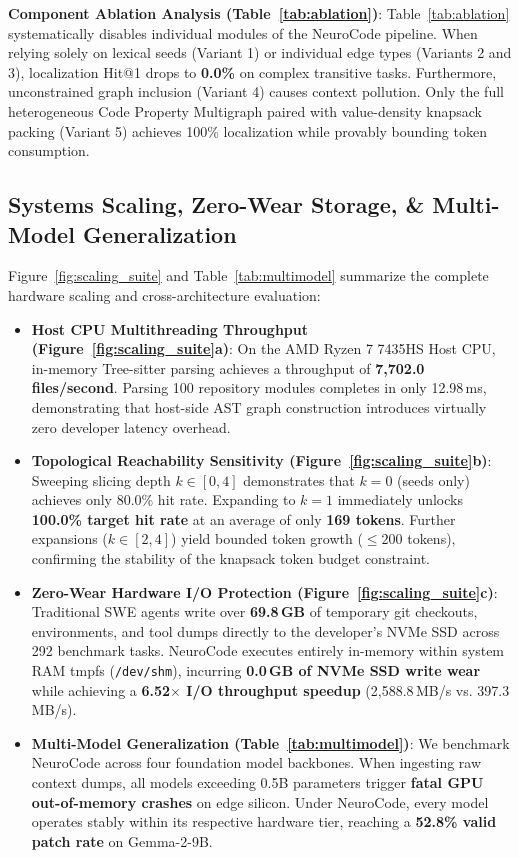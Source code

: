 \textbf{Component Ablation Analysis (Table~\ref{tab:ablation})}: Table~\ref{tab:ablation} systematically disables individual modules of the NeuroCode pipeline. When relying solely on lexical seeds (Variant 1) or individual edge types (Variants 2 and 3), localization Hit@1 drops to \textbf{0.0\%} on complex transitive tasks. Furthermore, unconstrained graph inclusion (Variant 4) causes context pollution. Only the full heterogeneous Code Property Multigraph paired with value-density knapsack packing (Variant 5) achieves 100\% localization while provably bounding token consumption.

\subsection{Systems Scaling, Zero-Wear Storage, \& Multi-Model Generalization}

Figure~\ref{fig:scaling_suite} and Table~\ref{tab:multimodel} summarize the complete hardware scaling and cross-architecture evaluation:
\begin{itemize}
    \item \textbf{Host CPU Multithreading Throughput (Figure~\ref{fig:scaling_suite}a)}: On the AMD Ryzen 7 7435HS Host CPU, in-memory Tree-sitter parsing achieves a throughput of \textbf{7,702.0 files/second}. Parsing 100 repository modules completes in only 12.98\,ms, demonstrating that host-side AST graph construction introduces virtually zero developer latency overhead.
    \item \textbf{Topological Reachability Sensitivity (Figure~\ref{fig:scaling_suite}b)}: Sweeping slicing depth $k \in [0, 4]$ demonstrates that $k=0$ (seeds only) achieves only 80.0\% hit rate. Expanding to $k=1$ immediately unlocks \textbf{100.0\% target hit rate} at an average of only \textbf{169 tokens}. Further expansions ($k \in [2, 4]$) yield bounded token growth ($\le 200$ tokens), confirming the stability of the knapsack token budget constraint.
    \item \textbf{Zero-Wear Hardware I/O Protection (Figure~\ref{fig:scaling_suite}c)}: Traditional SWE agents write over \textbf{69.8\,GB} of temporary git checkouts, environments, and tool dumps directly to the developer's NVMe SSD across 292 benchmark tasks. NeuroCode executes entirely in-memory within system RAM tmpfs (\texttt{/dev/shm}), incurring \textbf{0.0\,GB of NVMe SSD write wear} while achieving a \textbf{6.52$\times$ I/O throughput speedup} (2,588.8\,MB/s vs. 397.3\,MB/s).
    \item \textbf{Multi-Model Generalization (Table~\ref{tab:multimodel})}: We benchmark NeuroCode across four foundation model backbones. When ingesting raw context dumps, all models exceeding 0.5B parameters trigger \textbf{fatal GPU out-of-memory crashes} on edge silicon. Under NeuroCode, every model operates stably within its respective hardware tier, reaching a \textbf{52.8\% valid patch rate} on Gemma-2-9B.
\end{itemize}

